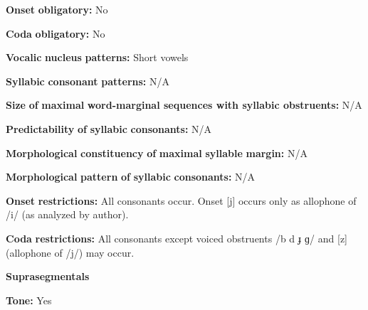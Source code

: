 \documentclass[output=paper]{langsci/langscibook}
\begin{document}
\begin{styleBody}
\textbf{Onset} \textbf{obligatory:} No
\end{styleBody}

\begin{styleBody}
\textbf{Coda} \textbf{obligatory:} No
\end{styleBody}

\begin{styleBody}
\textbf{Vocalic} \textbf{nucleus} \textbf{patterns:} Short vowels
\end{styleBody}

\begin{styleBody}
\textbf{Syllabic} \textbf{consonant} \textbf{patterns:} N/A
\end{styleBody}

\begin{styleBody}
\textbf{Size} \textbf{of} \textbf{maximal} \textbf{word{}-marginal sequences with syllabic obstruents:} N/A
\end{styleBody}

\begin{styleBody}
\textbf{Predictability} \textbf{of} \textbf{syllabic} \textbf{consonants:} N/A
\end{styleBody}

\begin{styleBody}
\textbf{Morphological} \textbf{constituency} \textbf{of} \textbf{maximal} \textbf{syllable} \textbf{margin:} N/A
\end{styleBody}

\begin{styleBody}
\textbf{Morphological} \textbf{pattern} \textbf{of} \textbf{syllabic} \textbf{consonants:} N/A
\end{styleBody}

\begin{styleBody}
\textbf{Onset} \textbf{restrictions:} All consonants occur. Onset [j] occurs only as allophone of /i/ (as analyzed by author).
\end{styleBody}

\begin{styleBody}
\textbf{Coda} \textbf{restrictions:} All consonants except voiced obstruents /b d ɟ ɡ/ and [z] (allophone of /j/) may occur.
\end{styleBody}

\begin{styleBody}
\textbf{Suprasegmentals}
\end{styleBody}

\begin{styleBody}
\textbf{Tone:} Yes
\end{styleBody}
\end{document}

